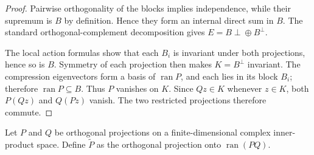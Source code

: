 \begin{proof}\leanok
    Pairwise orthogonality of the blocks implies independence, while their
    supremum is $B$ by definition. Hence they form an internal direct sum in
    $B$. The standard orthogonal-complement decomposition gives
    $E=B\mathbin{\perp\!\oplus}B^\perp$.

    The local action formulas show that each $B_i$ is invariant under both
    projections, hence so is $B$. Symmetry of each projection then makes
    $K=B^\perp$ invariant. The compression eigenvectors form a basis of
    $\operatorname{ran}P$, and each lies in its block $B_i$; therefore
    $\operatorname{ran}P\subseteq B$. Thus $P$ vanishes on $K$. Since $Qz\in K$
    whenever $z\in K$, both $P(Qz)$ and $Q(Pz)$ vanish. The two restricted
    projections therefore commute.
\end{proof}
\begin{definition}
    \label{def:mpu_two_projection_reduced_projection}
    \leanok

    Let $P$ and $Q$ be orthogonal projections on a finite-dimensional complex
    inner-product space. Define $\widetilde P$ as the orthogonal projection onto
    $\operatorname{ran}(PQ)$.
\end{definition}

